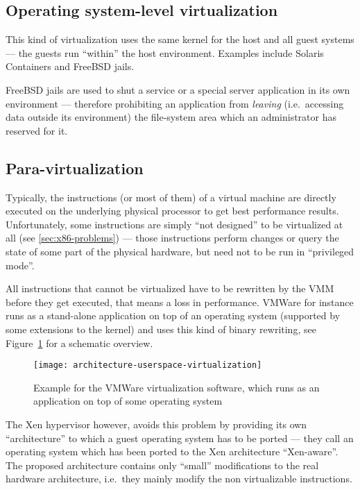 \subsection{Operating system-level  virtualization}
\label{sec:oper-syst-level}

This kind  of virtualization  uses the  same kernel for  the host  and all
guest  systems  ---  the  guests  run  ``within''  the  host  environment.
Examples include Solaris Containers and FreeBSD jails.

FreeBSD jails are  used to shut a service or  a special server application
in  its own  environment  --- therefore  prohibiting  an application  from
\emph{leaving}   (i.e.~accessing  data   outside   its  environment)   the
file-system area which an administrator has reserved for it.

\subsection{Para-virtualization}
\label{sec:paravirtualization}

Typically, the  instructions (or  most of them)  of a virtual  machine are
directly  executed  on  the  underlying  physical processor  to  get  best
performance  results.  Unfortunately, some  instructions are  simply ``not
designed'' to be virtualized at all (see \ref{sec:x86-problems}) --- those
instructions  perform changes  or  query the  state  of some  part of  the
physical hardware, but need not to be run in ``privileged mode''.

All instructions that  cannot be virtualized have to  be rewritten by the
VMM before  they get executed, that  means a loss  in performance.  VMWare
\cite{vmware} for instance runs as  a stand-alone application on top of an
operating system  (supported by  some extensions to  the kernel)  and uses
this kind of  binary rewriting, see Figure~\ref{fig:arch-userspace-virt} for
a schematic overview.

\begin{figure}[htbp]
  \centering
  \texttt{[image: architecture-userspace-virtualization]}
  \caption[Virtualization  in  the   user-space]{Example  for  the  VMWare
    virtualization software, which  runs as an application on  top of some
    operating system}
  \label{fig:arch-userspace-virt}
\end{figure}

The Xen  hypervisor \cite{xen} however,  avoids this problem  by providing
its  own ``architecture''  to which  a guest  operating system  has  to be
ported --- they call an operating  system which has been ported to the Xen
architecture  ``Xen-aware''.   The  proposed  architecture  contains  only
``small''  modifications  to  the  real hardware  architecture,  i.e.~they
mainly modify the non virtualizable instructions.

